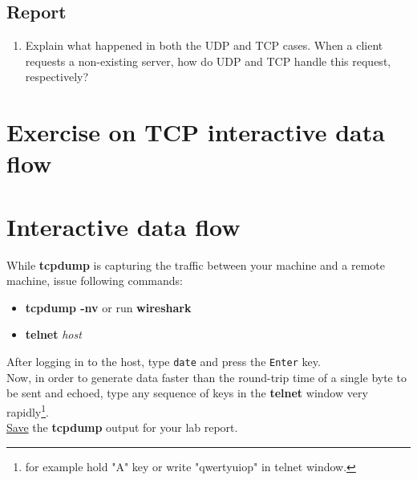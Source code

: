 \documentclass{../UTNetLab}
\begin{document}
    \subsection*{Report}
    \begin{enumerate}
        \item Explain what happened in both the UDP and TCP cases. When a client requests a non-existing server, how do UDP and TCP handle this request, respectively?
    \end{enumerate}

\section*{Exercise on TCP interactive data flow}
\section{Interactive data flow}
While \textbf{tcpdump} is capturing the traffic between your machine and a remote machine, issue following commands:
    \begin{itemize}
        \item \textbf{tcpdump -nv} or run \textbf{wireshark}
        \item \textbf{telnet} \textit{host}
    \end{itemize}
    After logging in to the host, type \texttt{date} and press the \texttt{Enter} key. \\
    Now, in order to generate data faster than the round-trip time of a single byte to be sent and echoed, type any sequence of keys in the \textbf{telnet} window very rapidly\footnote{for example hold "A" key or write "qwertyuiop" in telnet window.}. \\
    \underline{Save} the \textbf{tcpdump} output for your lab report.
\end{document}
